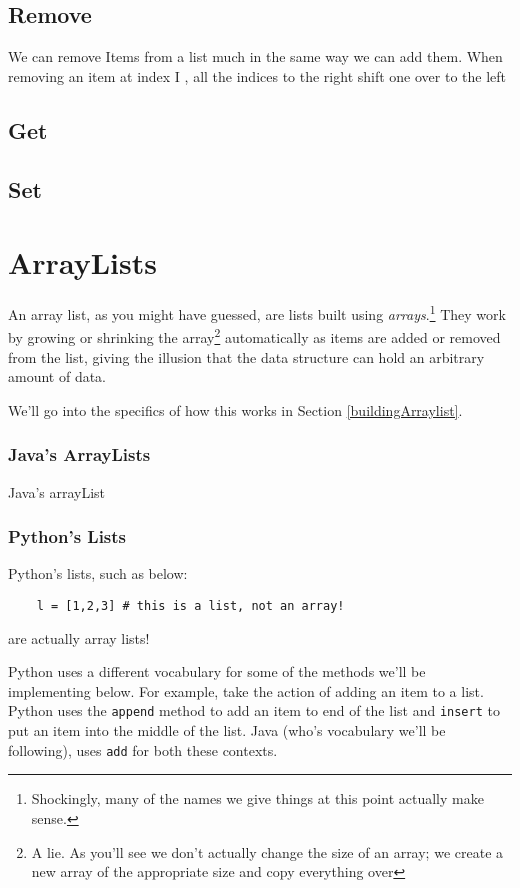 \subsection{Remove}  We can remove Items from a list much in the same way we can add them. When removing an item at index I , all the indices to the right shift one over to the left 
\subsection{Get}
\subsection{Set}

\section{ArrayLists}
An array list, as you might have guessed, are lists built using \textit{arrays}.\footnote{Shockingly, many of the names we give things at this point actually make sense.}
They work by growing or shrinking the array\footnote{A lie.  As you'll see we don't actually change the size of an array;  we create a new array of the appropriate size and copy everything over} automatically as items are added or removed from the list, giving the illusion that the data structure can hold an arbitrary amount of data.

We'll go into the specifics of how this works in Section \ref{buildingArraylist}.


\subsubsection{Java's ArrayLists}
Java's arrayList
\subsubsection{Python's Lists}
Python's lists, such as below:
\begin{verbatim}
	l = [1,2,3] # this is a list, not an array!	
\end{verbatim}
are actually array lists! %

Python uses a different vocabulary for some of the methods we'll be implementing below.  
For example, take the action of adding an item to a list.
Python uses the \texttt{append} method to add an item to end of the list and \texttt{insert} to put an item into the middle of the list.
Java (who's vocabulary we'll be following), uses \texttt{add} for both these contexts. 









